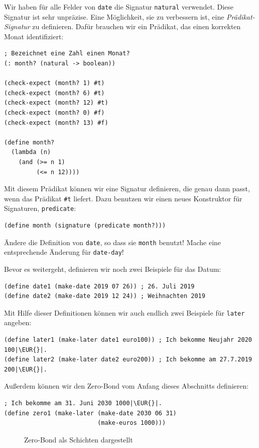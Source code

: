 \begin{aufgabeinline}
  Wir haben für alle Felder von \lstinline{date} die Signatur
  \lstinline{natural} verwendet. Diese Signatur ist sehr unpräzise.
  Eine Möglichkeit, sie zu verbessern ist, eine
  \textit{Prädikat-Signatur} zu definieren.
  Dafür brauchen wir ein Prädikat, das einen korrekten Monat
  identifiziert:
\begin{lstlisting}
; Bezeichnet eine Zahl einen Monat?
(: month? (natural -> boolean))

(check-expect (month? 1) #t)
(check-expect (month? 6) #t)
(check-expect (month? 12) #t)
(check-expect (month? 0) #f)
(check-expect (month? 13) #f)

(define month?
  (lambda (n)
    (and (>= n 1)
         (<= n 12))))  
\end{lstlisting}
  Mit diesem Prädikat können wir eine Signatur definieren, die genau
  dann passt, wenn das Prädikat \lstinline{#t} liefert.  Dazu benutzen wir
  einen neues Konstruktor für Signaturen, \lstinline{predicate}:
\begin{lstlisting}
(define month (signature (predicate month?)))
\end{lstlisting}
%
  Ändere die Definition von \lstinline{date}, so dass sie
  \lstinline{month} benutzt!  Mache eine entsprechende Änderung für
  \lstinline{date-day}!
\end{aufgabeinline}
%
Bevor es weitergeht, definieren wir noch zwei Beispiele für das Datum:
%
\begin{lstlisting}
(define date1 (make-date 2019 07 26)) ; 26. Juli 2019
(define date2 (make-date 2019 12 24)) ; Weihnachten 2019
\end{lstlisting}
%
Mit Hilfe dieser Definitionen können wir auch endlich zwei Beispiele
für \lstinline{later} angeben:
%
\begin{lstlisting}
(define later1 (make-later date1 euro100)) ; Ich bekomme Neujahr 2020 100|\EUR{}|.
(define later2 (make-later date2 euro200)) ; Ich bekomme am 27.7.2019 200|\EUR{}|.
\end{lstlisting}
%
Außerdem können wir den Zero-Bond vom Anfang dieses Abschnitts
definieren:
%
\begin{lstlisting}
; Ich bekomme am 31. Juni 2030 1000|\EUR{}|.
(define zero1 (make-later (make-date 2030 06 31)
                          (make-euros 1000)))
\end{lstlisting}

\begin{figure}[tb]
  \centering
{}
  
  \caption{Zero-Bond als Schichten dargestellt}
  \label{fig:zero-bond}
\end{figure}

